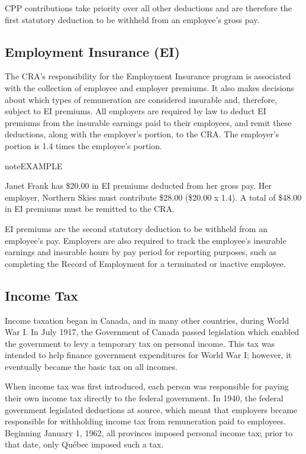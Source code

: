 \documentclass[letterpaper,10pt,english]{sphinxmanual}
\begin{document}
\sphinxAtStartPar
CPP contributions take priority over all other deductions and are therefore the first statutory
deduction to be withheld from an employee’s gross pay.


\subsection{Employment Insurance (EI)}
\label{\detokenize{2_compliance:employment-insurance-ei}}
\sphinxAtStartPar
The CRA’s responsibility for the Employment Insurance program is associated with the
collection of employee and employer premiums. It also makes decisions about which types of
remuneration are considered insurable and, therefore, subject to EI premiums.
All employers are required by law to deduct EI premiums from the insurable earnings paid to
their employees, and remit these deductions, along with the employer’s portion, to the CRA.
The employer’s portion is 1.4 times the employee’s portion.

\begin{sphinxadmonition}{note}{EXAMPLE}

\sphinxAtStartPar
Janet Frank has \$20.00 in EI premiums deducted from her gross pay. Her employer, Northern
Skies must contribute \$28.00 (\$20.00 x 1.4). A total of \$48.00 in EI premiums must be
remitted to the CRA.
\end{sphinxadmonition}

\sphinxAtStartPar
EI premiums are the second statutory deduction to be withheld from an employee’s pay.
Employers are also required to track the employee’s insurable earnings and insurable hours
by pay period for reporting purposes, such as completing the Record of Employment for a
terminated or inactive employee.


\subsection{Income Tax}
\label{\detokenize{2_compliance:income-tax}}
\sphinxAtStartPar
Income taxation began in Canada, and in many other countries, during World War I. In July
1917, the Government of Canada passed legislation which enabled the government to levy a
temporary tax on personal income. This tax was intended to help finance government
expenditures for World War I; however, it eventually became the basic tax on all incomes.

\sphinxAtStartPar
When income tax was first introduced, each person was responsible for paying their own
income tax directly to the federal government. In 1940, the federal government legislated
deductions at source, which meant that employers became responsible for withholding
income tax from remuneration paid to employees. Beginning January 1, 1962, all provinces
imposed personal income tax; prior to that date, only Québec imposed such a tax.
\end{document}
